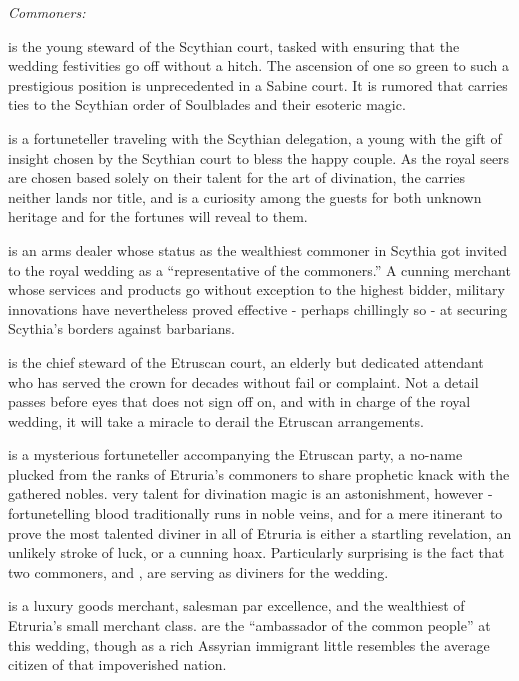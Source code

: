 \documentclass[blue]{Kos}
\begin{document}
\name{\bWhosWho{}}

\emph{Commoners:}

\cButler{} is the young steward of the Scythian court, tasked with ensuring that the wedding festivities go off without a hitch. The ascension of one so green to such a prestigious position is unprecedented in a Sabine court. It is rumored that \cButler{\they} carries ties to the Scythian order of Soulblades and their esoteric magic.

\cBurglar{} is a fortuneteller traveling with the Scythian delegation, a young \cBurglar{\human} with the gift of insight chosen by the Scythian court to bless the happy couple. As the royal seers are chosen based solely on their talent for the art of divination, the \cBurglar{\human} carries neither lands nor title, and \cBurglar{\they} is a curiosity among the guests for both \cBurglar{\their} unknown heritage and for the fortunes \cBurglar{\they} will reveal to them.

\cArmsDealer{} is an arms dealer whose status as the wealthiest commoner in Scythia got \cArmsDealer{\them} invited to the royal wedding as a ``representative of the commoners.'' A cunning merchant whose services and products go without exception to the highest bidder, \cArmsDealer{\their} military innovations have nevertheless proved effective - perhaps chillingly so - at securing Scythia's borders against barbarians.

\cAssassin{} is the chief steward of the Etruscan court, an elderly but dedicated attendant who has served the crown for decades without fail or complaint. Not a detail passes before \cAssassin{\their} eyes that \cAssassin{\they} does not sign off on, and with \cAssassin{\them} in charge of the royal wedding, it will take a miracle to derail the Etruscan arrangements.

\cFugitive{} is a mysterious fortuneteller accompanying the Etruscan party, a no-name plucked from the ranks of Etruria's commoners to share \cFugitive{\their} prophetic knack with the gathered nobles. \cFugitive{\Their} very talent for divination magic is an astonishment, however - fortunetelling blood traditionally runs in noble veins, and for a mere itinerant to prove the most talented diviner in all of Etruria is either a startling revelation, an unlikely stroke of luck, or a cunning hoax. Particularly surprising is the fact that two commoners, \cFugitive{} and \cBurglar{}, are serving as diviners for the wedding.

\cMerchant{} is a luxury goods merchant, salesman par excellence, and the wealthiest of Etruria's small merchant class. \cMerchant{\They} are the ``ambassador of the common people'' at this wedding, though as a rich Assyrian immigrant \cMerchant{\they} little resembles the average citizen of that impoverished nation. 
\end{document}
